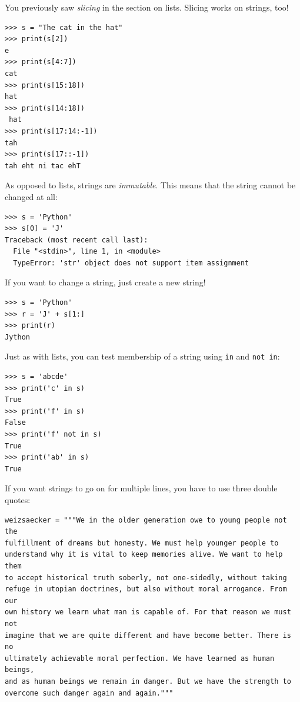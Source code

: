 \documentclass[11pt]{cselabheader}
\begin{document}
You previously saw \emph{slicing} in the section on lists. Slicing works on strings, too!
\begin{lstlisting}[style=ipython]
>>> s = "The cat in the hat"
>>> print(s[2])
e
>>> print(s[4:7])
cat
>>> print(s[15:18])
hat
>>> print(s[14:18])
 hat
>>> print(s[17:14:-1])
tah
>>> print(s[17::-1])
tah eht ni tac ehT
\end{lstlisting}

As opposed to lists, strings are \emph{immutable}. This means that the string
cannot be changed at all:
\begin{lstlisting}[style=ipython]
>>> s = 'Python'
>>> s[0] = 'J'
Traceback (most recent call last):
  File "<stdin>", line 1, in <module>
  TypeError: 'str' object does not support item assignment
\end{lstlisting}

If you want to change a string, just create a new string!
\begin{lstlisting}[style=ipython]
>>> s = 'Python'
>>> r = 'J' + s[1:]
>>> print(r)
Jython
\end{lstlisting}

Just as with lists, you can test membership of a string using \lstinline!in! and
\lstinline!not in!:
\begin{lstlisting}[style=ipython]
>>> s = 'abcde'
>>> print('c' in s)
True
>>> print('f' in s)
False
>>> print('f' not in s)
True
>>> print('ab' in s)
True
\end{lstlisting}

If you want strings to go on for multiple lines, you have to use three double
quotes:
\begin{lstlisting}[caption={Excerpt of Richard von Weizs\"{a}cker's speech in
the Bundestag to commemorate the 40th anniversary of the end of World War II.}]
weizsaecker = """We in the older generation owe to young people not the 
fulfillment of dreams but honesty. We must help younger people to 
understand why it is vital to keep memories alive. We want to help them 
to accept historical truth soberly, not one-sidedly, without taking 
refuge in utopian doctrines, but also without moral arrogance. From our
own history we learn what man is capable of. For that reason we must not
imagine that we are quite different and have become better. There is no
ultimately achievable moral perfection. We have learned as human beings,
and as human beings we remain in danger. But we have the strength to 
overcome such danger again and again."""
\end{lstlisting}
\end{document}
